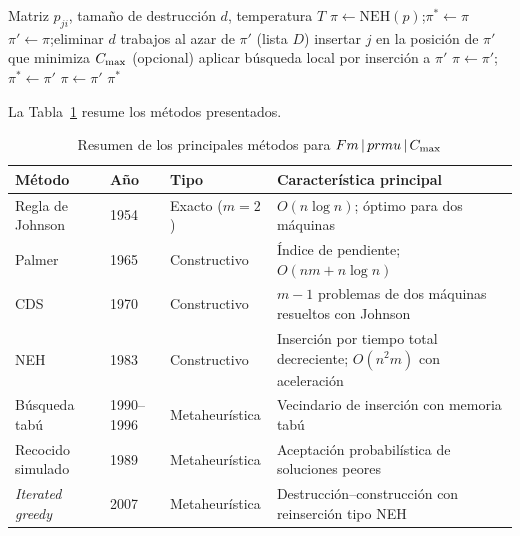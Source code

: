 \begin{algorithm}[htbp]
\caption{Esquema del algoritmo \textit{iterated greedy} (IG)}\label{alg:ig}
\begin{algorithmic}[1]
\Require Matriz $p_{ji}$, tamaño de destrucción $d$, temperatura $T$
\State $\pi \gets \text{NEH}(p)$;\quad $\pi^{*} \gets \pi$
  \State $\pi' \gets \pi$;\quad eliminar $d$ trabajos al azar de $\pi'$ (lista $D$)
    \State insertar $j$ en la posición de $\pi'$ que minimiza $C_{\max}$
  \EndFor
  \State (opcional) aplicar búsqueda local por inserción a $\pi'$
    \State $\pi \gets \pi'$;\quad {} $\pi^{*}\gets\pi'$ \EndIf
    \State $\pi \gets \pi'$
  \EndIf
\EndWhile
\State \Return $\pi^{*}$
\end{algorithmic}
\end{algorithm}

La Tabla~\ref{tab:metodos} resume los métodos presentados.

\begin{table}[htbp]
\caption{Resumen de los principales métodos para $Fm\,|\,prmu\,|\,C_{\max}$}\label{tab:metodos}
\centering
\small
\begin{tabularx}{\textwidth}{@{}l l l X@{}}
\toprule
Método & Año & Tipo & Característica principal \\
\midrule
Regla de Johnson & 1954 & Exacto ($m=2$) & $O(n\log n)$; óptimo para dos máquinas \\
Palmer & 1965 & Constructivo & Índice de pendiente; $O(nm+n\log n)$ \\
CDS & 1970 & Constructivo & $m-1$ problemas de dos máquinas resueltos con Johnson \\
NEH & 1983 & Constructivo & Inserción por tiempo total decreciente; $O(n^2m)$ con aceleración \\
Búsqueda tabú & 1990--1996 & Metaheurística & Vecindario de inserción con memoria tabú \\
Recocido simulado & 1989 & Metaheurística & Aceptación probabilística de soluciones peores \\
\textit{Iterated greedy} & 2007 & Metaheurística & Destrucción--construcción con reinserción tipo NEH \\
\bottomrule
\end{tabularx}
\end{table}


